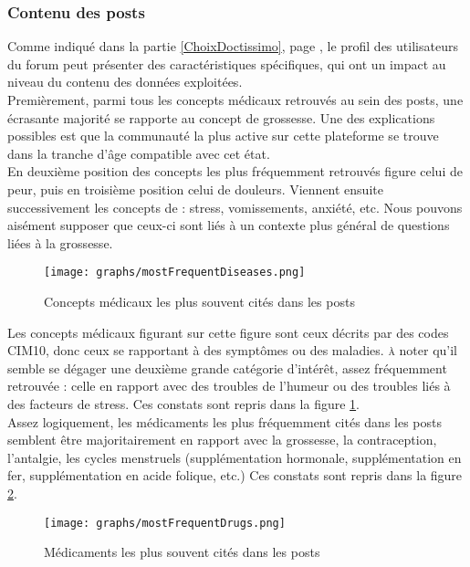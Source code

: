 \documentclass[a4paper, 12pt, openany, oneside, abstract=on]{article} %
\begin{document}
\subsubsection{Contenu des posts}
\label{contenuPosts}
Comme indiqué dans la partie \ref{ChoixDoctissimo}, page \pageref{ChoixDoctissimo}, le profil des utilisateurs du forum peut présenter des caractéristiques spécifiques, qui ont un impact au niveau du contenu des données exploitées.\\
Premièrement, parmi tous les concepts médicaux retrouvés au sein des posts, une écrasante majorité se rapporte au concept de \og{}grossesse\fg{}. Une des explications possibles est que la communauté la plus active sur cette plateforme se trouve dans la tranche d'âge compatible avec cet état.\\
En deuxième position des concepts les plus fréquemment retrouvés figure celui de \og{}peur\fg{}, puis en troisième position celui de \og{}douleurs\fg{}. Viennent ensuite successivement les concepts de : \og{}stress\fg{}, \og{}vomissements\fg{}, \og{}anxiété\fg{}, etc. Nous pouvons aisément supposer que ceux-ci sont liés à un contexte plus général de questions liées à la grossesse.

\begin{figure}[H]
    \centering
    \texttt{[image: graphs/mostFrequentDiseases.png]}
    \caption{\label{fig:mostFrqDis}Concepts médicaux les plus souvent cités dans les posts}
\end{figure}
Les concepts médicaux figurant sur cette figure sont ceux décrits par des codes CIM10, donc ceux se rapportant à des symptômes ou des maladies.
\textsc{à} noter qu'il semble se dégager une deuxième grande catégorie d'intérêt, assez fréquemment retrouvée : celle en rapport avec des troubles de l'humeur ou des troubles liés à des facteurs de stress.
Ces constats sont repris dans la figure \ref{fig:mostFrqDis}.\\

Assez logiquement, les médicaments les plus fréquemment cités dans les posts semblent être majoritairement en rapport avec la grossesse, la contraception, l'antalgie, les cycles menstruels (supplémentation hormonale, supplémentation en fer, supplémentation en acide folique, etc.)
Ces constats sont repris dans la figure \ref{fig:mostFrqDrg}.\\
\begin{figure}[H]
    \centering
    \texttt{[image: graphs/mostFrequentDrugs.png]}
    \caption{\label{fig:mostFrqDrg}Médicaments les plus souvent cités dans les posts}
\end{figure}
\end{document}
